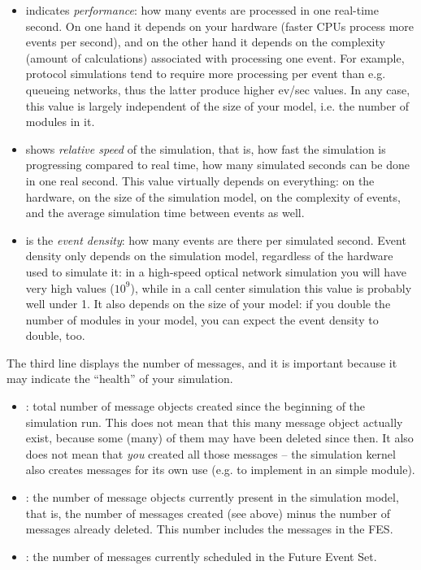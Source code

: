 \begin{itemize}
   \item {} indicates \textit{performance}: how many events are
     processed in one real-time second.  On one hand it depends on your hardware
     (faster CPUs process more events per second), and on the other hand
     it depends on the complexity (amount of calculations) associated
     with processing one event. For example, protocol simulations tend to require
     more processing per event than e.g. queueing networks, thus the latter
     produce higher ev/sec values. In any case, this value is largely
     independent of the size of your model, i.e. the number of modules in it.
   \item {} shows \textit{relative speed} of the simulation, that
     is, how fast the simulation is progressing compared to real time, how many
     simulated seconds can be done in one real second. This value virtually depends
     on everything: on the hardware, on the size of the simulation model,
     on the complexity of events, and the average simulation time between events as well.
   \item {} is the \textit{event density}: how many events are
     there per simulated second. Event density only depends on the simulation model,
     regardless of the hardware used to simulate it: in a high-speed
     optical network simulation you will have very high values ($10^9$), 
     while in a call center simulation this value is probably well
     under 1. It also depends on the size of your model: if you double the
     number of modules in your model, you can expect the event density to
     double, too.
\end{itemize}

The third line displays the number of messages, and it is important
because it may indicate the ``health'' of your simulation.

\begin{itemize}
   \item{: total number of message objects created since the
     beginning of the simulation run. This does not mean that this many message
     object actually exist, because some (many) of them may have been deleted
     since then. It also does not mean that \textit{you} created all those
     messages -- the simulation kernel also creates messages for its own use
     (e.g. to implement  in an  simple module).}
   \item{: the number of message objects currently present
     in the simulation model, that is, the number of messages created (see above)
     minus the number of messages already deleted. This number includes
     the messages in the FES.}
   \item{: the number of messages currently scheduled in the
     Future Event Set.}
\end{itemize}


